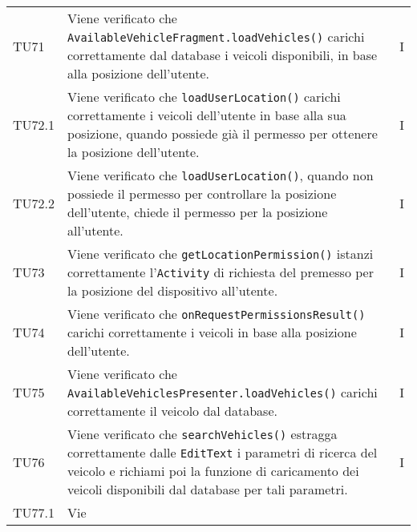 \begin{longtable}{ >{\centering}p{}  >{\centering}p{} >{\centering}p{}
			}
		TU71 & Viene verificato che \texttt{AvailableVehicleFragment.loadVehicles()} carichi correttamente dal database i veicoli disponibili, in base alla posizione dell'utente. & I 
		\tabularnewline	
		TU72.1 & Viene verificato che \texttt{loadUserLocation()} carichi correttamente i veicoli dell'utente in base alla sua posizione, quando possiede già il permesso per ottenere la posizione dell'utente. & I 
		\tabularnewline	
		TU72.2 & Viene verificato che \texttt{loadUserLocation()}, quando non possiede il permesso per controllare la posizione dell'utente, chiede il permesso per la posizione all'utente. & I 
		\tabularnewline	
		TU73 & Viene verificato che \texttt{getLocationPermission()} istanzi correttamente l'\texttt{Activity} di richiesta del premesso per la posizione del dispositivo all'utente. & I 
		\tabularnewline	
		TU74 & Viene verificato che \texttt{onRequestPermissionsResult()} carichi correttamente i veicoli in base alla posizione dell'utente. & I 
		\tabularnewline	
		TU75 & Viene verificato che \texttt{AvailableVehiclesPresenter.loadVehicles()} carichi correttamente il veicolo dal database. & I 
		\tabularnewline	
		TU76 & Viene verificato che \texttt{searchVehicles()} estragga correttamente dalle \texttt{EditText} i parametri di ricerca del veicolo e richiami poi la funzione di caricamento dei veicoli disponibili dal database per tali parametri. & I 
		\tabularnewline	
		TU77.1 & Vie

\end{longtable}
